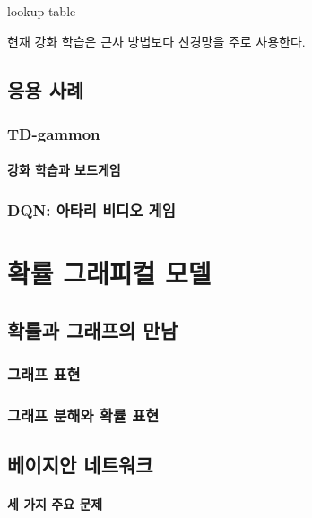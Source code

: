 \documentclass [12pt] {oblivoir}
\let\oldsubsubsection=\subsubsection
\renewcommand{\subsubsection}
{
  \filbreak
  \oldsubsubsection
}
\begin{document}
lookup table

현재 강화 학습은 근사 방법보다 신경망을 주로 사용한다.

\subsection{응용 사례}

\subsubsection{TD-gammon}

\paragraph*{강화 학습과 보드게임}\mbox{}

\vspace{3mm}

\subsubsection{DQN: 아타리 비디오 게임}

\newpage
\section{확률 그래피컬 모델}

\subsection{확률과 그래프의 만남}

\subsubsection{그래프 표현}

\subsubsection{그래프 분해와 확률 표현}

\subsection{베이지안 네트워크}

\paragraph*{세 가지 주요 문제}\mbox{}
\end{document}
